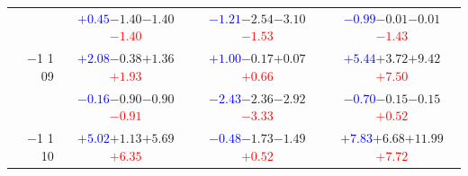 \documentclass[compress]{beamer}
\begin{document}
\begin{frame}
\begin{tabular}{r | c | c | c}
          & \textcolor{blue}{$+0.45$}\hspace{0.1 cm}$-1.40$\hspace{0.1 cm}$-1.40$\hspace{0.1 cm}\textcolor{red}{$-1.40$} & \textcolor{blue}{$-1.21$}\hspace{0.1 cm}$-2.54$\hspace{0.1 cm}$-3.10$\hspace{0.1 cm}\textcolor{red}{$-1.53$} & \textcolor{blue}{$-0.99$}\hspace{0.1 cm}$-0.01$\hspace{0.1 cm}$-0.01$\hspace{0.1 cm}\textcolor{red}{$-1.43$} \\
$-$1 1 09 & \textcolor{blue}{$+2.08$}\hspace{0.1 cm}$-0.38$\hspace{0.1 cm}$+1.36$\hspace{0.1 cm}\textcolor{red}{$+1.93$} & \textcolor{blue}{$+1.00$}\hspace{0.1 cm}$-0.17$\hspace{0.1 cm}$+0.07$\hspace{0.1 cm}\textcolor{red}{$+0.66$} & \textcolor{blue}{$+5.44$}\hspace{0.1 cm}$+3.72$\hspace{0.1 cm}$+9.42$\hspace{0.1 cm}\textcolor{red}{$+7.50$} \\
          & \textcolor{blue}{$-0.16$}\hspace{0.1 cm}$-0.90$\hspace{0.1 cm}$-0.90$\hspace{0.1 cm}\textcolor{red}{$-0.91$} & \textcolor{blue}{$-2.43$}\hspace{0.1 cm}$-2.36$\hspace{0.1 cm}$-2.92$\hspace{0.1 cm}\textcolor{red}{$-3.33$} & \textcolor{blue}{$-0.70$}\hspace{0.1 cm}$-0.15$\hspace{0.1 cm}$-0.15$\hspace{0.1 cm}\textcolor{red}{$+0.52$} \\
$-$1 1 10 & \textcolor{blue}{$+5.02$}\hspace{0.1 cm}$+1.13$\hspace{0.1 cm}$+5.69$\hspace{0.1 cm}\textcolor{red}{$+6.35$} & \textcolor{blue}{$-0.48$}\hspace{0.1 cm}$-1.73$\hspace{0.1 cm}$-1.49$\hspace{0.1 cm}\textcolor{red}{$+0.52$} & \textcolor{blue}{$+7.83$}\hspace{0.1 cm}$+6.68$\hspace{0.1 cm}$+11.99$\hspace{0.1 cm}\textcolor{red}{$+7.72$} \\

\end{tabular}
\end{frame}
\end{document}
